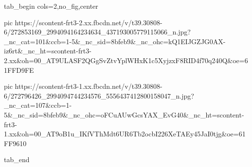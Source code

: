  
 
 
 
 

\ifcmt
  tab_begin cols=2,no_fig,center

     pic https://scontent-frt3-2.xx.fbcdn.net/v/t39.30808-6/272853169_2994094164234634_437193005779115066_n.jpg?_nc_cat=101&ccb=1-5&_nc_sid=8bfeb9&_nc_ohc=kQ1EIJGZJG0AX-iz6rt&_nc_ht=scontent-frt3-2.xx&oh=00_AT9ULASF2QGgSvZtvYplWHxK1c5XyjzxF8RID4f70q240Q&oe=61FFD9FE

     pic https://scontent-frt3-1.xx.fbcdn.net/v/t39.30808-6/272796426_2994094744234576_5556437412800158047_n.jpg?_nc_cat=107&ccb=1-5&_nc_sid=8bfeb9&_nc_ohc=oFCuAUwGcsYAX_EvG40&_nc_ht=scontent-frt3-1.xx&oh=00_AT9oB1u_IKfVThMdt6UR6Tb2ocbI226XeTAEy45JaI0tjg&oe=61FF9610

  tab_end
\fi
